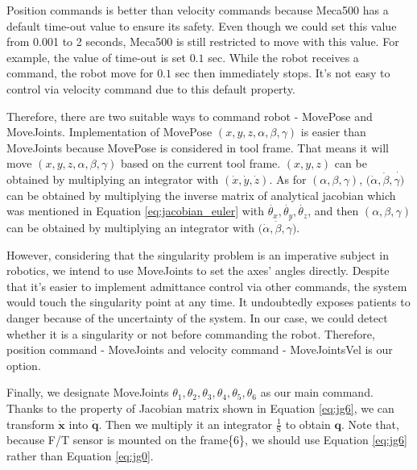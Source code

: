 \par
Position commands is better than velocity commands because Meca500 has a default time-out value to ensure its safety. Even though we could set this value from 0.001 to 2 seconds, Meca500 is still restricted to move with this value. For example, the value of time-out is set $0.1$ sec. While the robot receives a command, the robot move for $0.1$ sec then immediately stops. It's not easy to control via velocity command due to this default property.
\par
Therefore, there are two suitable ways to command robot - MovePose and MoveJoints. Implementation of MovePose $(x,y,z,\alpha ,\beta ,\gamma)$ is easier than MoveJoints because MovePose is considered in tool frame. That means it will move $(x,y,z,\alpha ,\beta ,\gamma)$ based on the current tool frame.  $(x,y,z)$ can be obtained by multiplying an integrator with $(\dot{x},\dot{y},\dot{z})$. As for $(\alpha ,\beta ,\gamma)$, $(\dot{\alpha} ,\dot{\beta} ,\dot{\gamma)}$ can be obtained by multiplying the inverse matrix of analytical jacobian which was mentioned in Equation \ref{eq:jacobian_euler} with $\dot{\theta _x},\dot{\theta _y},\dot{\theta _z}$, and then $(\alpha ,\beta ,\gamma)$ can be obtained by multiplying an integrator with $(\dot{\alpha} ,\dot{\beta} ,\dot{\gamma)}$.
\par
However, considering that the singularity problem is an imperative subject in robotics, we intend to use MoveJoints to set the axes' angles directly. Despite that it's easier to implement admittance control via other commands, the system would touch the singularity point at any time. It undoubtedly exposes patients to danger because of the uncertainty of the system. In our case, we could detect whether it is a singularity or not before commanding the robot. Therefore, position command - MoveJoints and velocity command - MoveJointsVel is our option. 
\par
Finally, we designate MoveJoints $\theta _1, \theta _2 ,\theta _3 ,\theta _4 ,\theta _5 , \theta _6 $ as our main command. Thanks to the property of Jacobian matrix shown in Equation \ref{eq:jg6}, we can transform $\boldsymbol{\dot{x}}$ into $\boldsymbol{\dot{q}}$. Then we multiply it an integrator $\frac{1}{\mathrm{S}}$
to obtain $\boldsymbol{q}$. Note that, because F/T sensor is mounted on the frame\{6\}, we should use Equation \ref{eq:jg6} rather than Equation \ref{eq:jg0}. 
